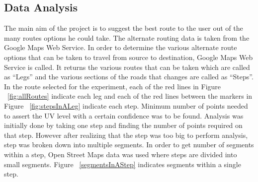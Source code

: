\documentclass[conference]{IEEETran}
\begin{document}
\subsection{Data Analysis}
The main aim of the project is to suggest the best route to the user out of the many routes options he could take. The alternate routing data is taken from the Google Maps Web Service. In order to determine the various alternate route options that can be taken to travel from source to destination, Google Maps Web Service is called. It returns the various routes that can be taken which are called as “Legs” and the various sections of the roads that changes are called as “Steps”. In the route selected for the experiment, each of the red lines in Figure ~\ref{fig:allRoutes} indicate each leg and each of the red lines between the markers in Figure ~\ref{fig:stepsInALeg} indicate each step. Minimum number of points needed to assert the UV level with a certain confidence was to be found. Analysis was initially done by taking one step and finding the number of points required on that step. However after realizing that the step was too big to perform analysis, step was broken down into multiple segments. In order to get number of segments within a step, Open Street Maps data was used where steps are divided into small segments.  Figure ~\ref{segmentsInAStep} indicates segments within a single step. 
\end{document}

